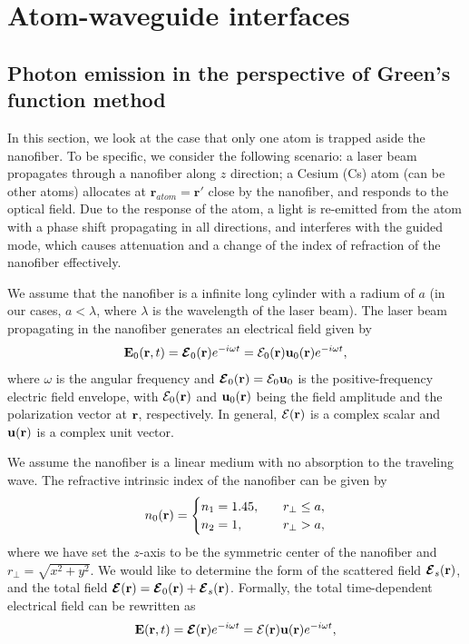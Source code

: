 \chapter{Atom-waveguide interfaces}

\section{Photon emission in the perspective of Green's function method}
In this section, we look at the case that only one atom is trapped aside the nanofiber. To be specific, we consider the following scenario: a laser beam propagates through a nanofiber along $ z $ direction; a Cesium (Cs) atom (can be other atoms) allocates at $ \mathbf{r}_{atom} =\mathbf{r}'$ close by the nanofiber, and responds to the optical field. Due to the response of the atom, a light is re-emitted
from the atom with a phase shift propagating in all directions, and interferes with the guided mode, which causes attenuation and a change of the index of refraction of the nanofiber effectively. 

We assume that the nanofiber is a infinite long cylinder with a radium of $ a $ (in our cases, $ a<\lambda $, where $ \lambda $ is the wavelength of the laser beam). The laser beam propagating in the nanofiber generates an electrical field given by
\begin{equation}
\mathbf{E}_0(\br,t)=\boldsymbol{\mathcal{E}}_0(\br)e^{-i\omega t} %
=\mathcal{E}_0(\br)\mathbf{u}_0(\br)e^{-i\omega t}, %
\label{Ert0}
\end{equation}
where $\omega$ is the angular frequency and $\boldsymbol{\mathcal{E}}_0(\mathbf{r})=\mathcal{E}_0\mathbf{u}_0$ is the positive-frequency electric field envelope,
with $\mathcal{E}_0(\mathbf{r})$ and $\mathbf{u}_0(\mathbf{r})$ being the field amplitude and the polarization vector at $ \mathbf{r} $, respectively.
In general, $\mathcal{E}(\mathbf{r})$ is a complex scalar and $\mathbf{u}(\mathbf{r})$ is a complex unit vector. 

We assume the nanofiber is a linear medium with no absorption to the traveling wave. The refractive intrinsic index of the nanofiber can be given by
\begin{align}
n_0(\mathbf{r}) = \begin{cases} 
n_1=1.45, &\quad r_\perp \leq a,\\
n_2=1, &\quad r_\perp >a,
\end{cases} 
\end{align}
where we have set the $ z $-axis to be the symmetric center of the nanofiber and $ r_\perp =\sqrt{x^2+y^2} $. We would like to determine the form of the scattered field $ \boldsymbol{\mathcal{E}}_s(\mathbf{r}) $, and the total field $ \boldsymbol{\mathcal{E}}(\mathbf{r})=\boldsymbol{\mathcal{E}}_0(\mathbf{r})+\boldsymbol{\mathcal{E}}_s(\mathbf{r}) $. Formally, the total time-dependent electrical field can be rewritten as 
\begin{equation}
\mathbf{E}(\br,t)=\boldsymbol{\mathcal{E}}(\br)e^{-i\omega t} %
=\mathcal{E}(\br)\mathbf{u}(\br)e^{-i\omega t}, %
\label{Ert}
\end{equation}


